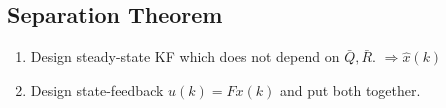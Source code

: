 \documentclass[landscape,a4paper,8pt]{scrartcl}
\begin{document}
\begin{multicols*}{3}
\subsection{Separation Theorem}

\begin{enumerate}
\item Design steady-state KF which does not depend on $\bar{Q}, \bar{R}$. $\Rightarrow \hat{x}(k)$
\item Design state-feedback $u(k) = F x(k)$ and put both together.
\end{enumerate}

\end{multicols*}
\end{document}
